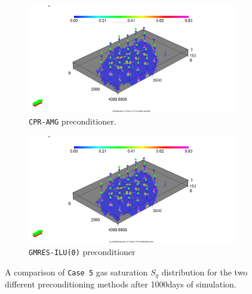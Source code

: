 \begin{figure}[h!]
\centering
\begin{subfigure}{.5\textwidth}
  \centering
  \includegraphics[width=1.3\linewidth]{figures/Case9_CPR_Sg.png}
  \caption{\texttt{CPR-AMG} preconditioner.}
\end{subfigure}%
\begin{subfigure}{.5\textwidth}
  \centering
  \includegraphics[width=1.3\linewidth]{figures/Case9_ILU-GMRES_Sg.png}
  \caption{\texttt{GMRES-ILU(0)} preconditioner}
\end{subfigure}
\caption{A comparison of \texttt{Case 5} gas saturation $S_{g}$ distribution for the two different preconditioning methods after 1000days of simulation.}
\label{case9sg}
\end{figure}


